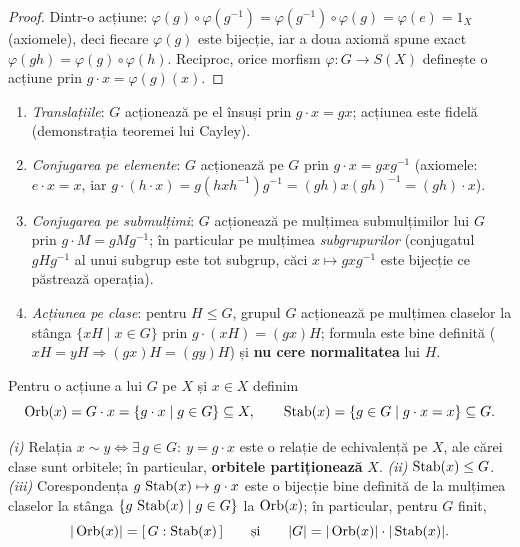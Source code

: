 \begin{proof}
Dintr-o acțiune: $\varphi(g)\circ\varphi(g^{-1})=\varphi(g^{-1})\circ\varphi(g)=\varphi(e)=1_X$ (axiomele), deci fiecare $\varphi(g)$ este bijecție, iar a doua axiomă spune exact $\varphi(gh)=\varphi(g)\circ\varphi(h)$. Reciproc, orice morfism $\varphi:G\to S(X)$ definește o acțiune prin $g\cdot x=\varphi(g)(x)$.
\end{proof}

\begin{exemplu}\label{ex:actiuni}
\begin{enumerate}[label=(\alph*),nosep]
\item \emph{Translațiile}: $G$ acționează pe el însuși prin $g\cdot x=gx$; acțiunea este fidelă (demonstrația teoremei lui Cayley).
\item \emph{Conjugarea pe elemente}: $G$ acționează pe $G$ prin $g\cdot x=gxg^{-1}$ (axiomele: $e\cdot x=x$, iar $g\cdot(h\cdot x)=g(hxh^{-1})g^{-1}=(gh)x(gh)^{-1}=(gh)\cdot x$).
\item \emph{Conjugarea pe submulțimi}: $G$ acționează pe mulțimea submulțimilor lui $G$ prin $g\cdot M=gMg^{-1}$; în particular pe mulțimea \emph{subgrupurilor} (conjugatul $gHg^{-1}$ al unui subgrup este tot subgrup, căci $x\mapsto gxg^{-1}$ este bijecție ce păstrează operația).
\item \emph{Acțiunea pe clase}: pentru $H\le G$, grupul $G$ acționează pe mulțimea claselor la stânga $\{xH\mid x\in G\}$ prin $g\cdot(xH)=(gx)H$; formula este bine definită ($xH=yH\Rightarrow(gx)H=(gy)H$) și \textbf{nu cere normalitatea} lui $H$.
\end{enumerate}
\end{exemplu}

\begin{definitie}
Pentru o acțiune a lui $G$ pe $X$ și $x\in X$ definim
\[
\operatorname{Orb}(x)=G\cdot x=\{g\cdot x\mid g\in G\}\subseteq X,
\qquad
\operatorname{Stab}(x)=\{g\in G\mid g\cdot x=x\}\subseteq G .
\]
\end{definitie}

\begin{teorema}\label{teo:orbstab}
\emph{(i)} Relația $x\sim y\iff\exists\,g\in G:\ y=g\cdot x$ este o relație de echivalență pe $X$, ale cărei clase sunt orbitele; în particular, \textbf{orbitele partiționează} $X$.
\emph{(ii)} $\operatorname{Stab}(x)\le G$.
\emph{(iii)} Corespondența $g\,\operatorname{Stab}(x)\mapsto g\cdot x$ este o bijecție bine definită de la mulțimea claselor la stânga $\{g\,\operatorname{Stab}(x)\mid g\in G\}$ la $\operatorname{Orb}(x)$; în particular, pentru $G$ finit,
\[
|\operatorname{Orb}(x)|=[\,G:\operatorname{Stab}(x)\,]\qquad\text{și}\qquad|G|=|\operatorname{Orb}(x)|\cdot|\operatorname{Stab}(x)| .
\]
\end{teorema}

